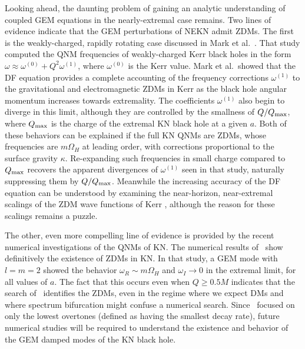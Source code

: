 \begin{refsection}
Looking ahead, the daunting problem of gaining an analytic understanding of coupled GEM equations in the nearly-extremal case remains.
Two lines of evidence indicate that the GEM perturbations of NEKN admit ZDMs.
The first is the weakly-charged, rapidly rotating case discussed in Mark et al.~\cite{Mark:2014aja}.
That study computed the QNM frequencies of weakly-charged Kerr black holes in the form $\omega \approx \omega^{(0)} + Q^2 \omega^{(1)}$, where $\omega^{(0)}$ is the Kerr value. Mark et al.~showed that the DF equation provides a complete accounting of the frequency corrections $\omega^{(1)}$ to the gravitational and electromagnetic ZDMs in Kerr as the black hole angular momentum increases towards extremality.
The coefficients $\omega^{(1)}$ also begin to diverge in this limit, although they are  controlled by the smallness of $Q/Q_{\rm max}$, where $Q_{\rm max}$ is the charge of the extremal KN black hole at a given $a$.
Both of these behaviors can be explained if the full KN QNMs are ZDMs, whose frequencies are $m\Omega_H$ at leading order, with corrections proportional to the surface gravity $\kappa$.
Re-expanding such frequencies in small charge compared to $Q_{\rm max}$ recovers the apparent divergences of $\omega^{(1)}$ seen in that study, naturally suppressing them by $Q/Q_{\rm max}$.
Meanwhile the increasing accuracy of the DF equation can be understood by examining the near-horizon, near-extremal scalings of the ZDM wave functions of Kerr \cite{Mark:2014aja}, although the reason for these scalings remains a puzzle.

The other, even more compelling line of evidence is provided by the recent numerical investigations of the QNMs of KN.
The numerical results of~\cite{Dias:2015wqa} show definitively the existence of ZDMs in KN. In that study, a GEM mode with $l=m=2$ showed the behavior $\omega_R \sim m \Omega_H$ and $\omega_I \to 0$ in the extremal limit, for all values of $a$.
The fact that this occurs even when $Q \geq 0.5 M$ indicates that the search of~\cite{Dias:2015wqa} identifies the ZDMs, even in the regime where we expect DMs and where spectrum bifurcation might confuse a numerical search. 
Since~\cite{Dias:2015wqa} focused on only the lowest overtones (defined as having the smallest decay rate), future numerical studies will be required to understand the existence and behavior of the GEM damped modes of the KN black hole.


\end{refsection}
